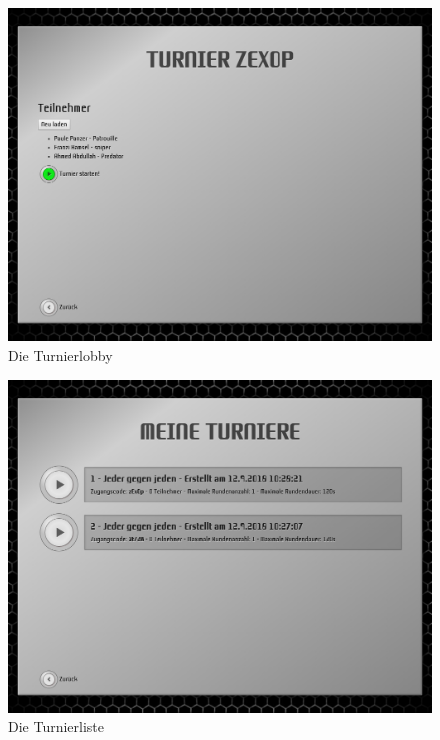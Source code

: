 \begin{figure}
  \centering
  \label{tournament-lobby}
  \includegraphics[width=15cm, keepaspectratio]{figures/10-turnierlobby.png}
  \caption{Die Turnierlobby}
\end{figure}

\begin{figure}
  \centering
  \label{tournament-list}
  \includegraphics[width=15cm, keepaspectratio]{figures/8-turnierliste.png}
  \caption{Die Turnierliste}
\end{figure}

